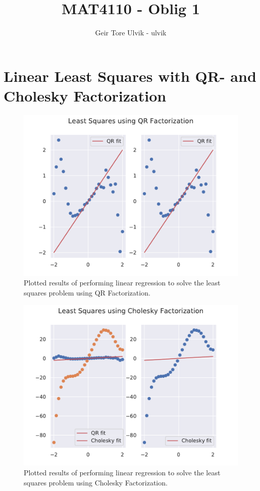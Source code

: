 \documentclass[12pt]{article}
\begin{document}
\title{MAT4110 - Oblig 1}
\author{Geir Tore Ulvik - ulvik}
\maketitle

\section{Linear Least Squares with QR- and Cholesky Factorization}
\begin{figure}
	\includegraphics[width = \textwidth]{figures/QR.pdf}
	\caption{Plotted results of performing linear regression to solve the least squares
		problem using QR Factorization.}
\end{figure}
\begin{figure}
	\includegraphics[width = \textwidth]{figures/Cholesky.pdf}
	\caption{Plotted results of performing linear regression to solve the least squares
		problem using Cholesky Factorization.}
\end{figure}
\end{document}
